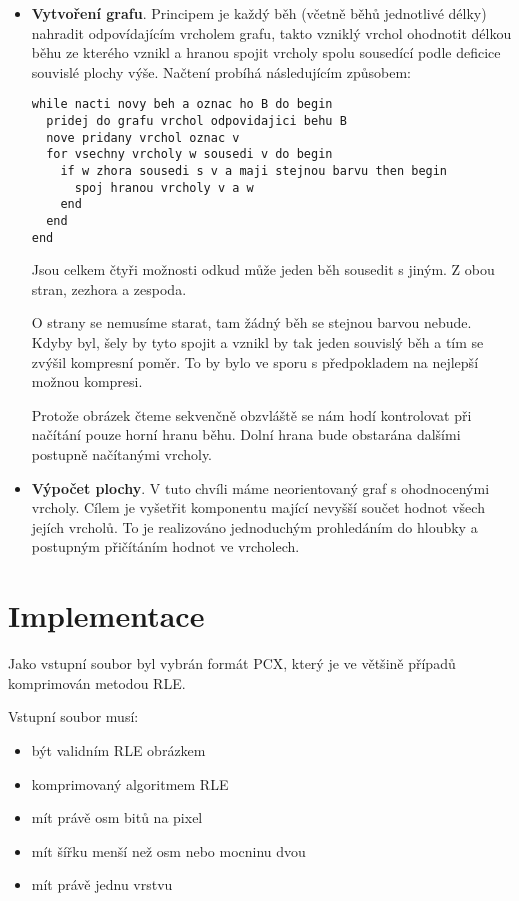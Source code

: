 \documentclass[12pt,a4paper]{article}
\begin{document}
\begin{itemize}
\item \textbf{Vytvoření grafu}. Principem je každý běh (včetně běhů jednotlivé délky) nahradit odpovídajícím vrcholem grafu, takto vzniklý vrchol ohodnotit délkou běhu ze kterého vznikl a hranou spojit vrcholy spolu sousedící podle deficice souvislé plochy výše. Načtení probíhá následujícím způsobem:

\begin{lstlisting}
while nacti novy beh a oznac ho B do begin
  pridej do grafu vrchol odpovidajici behu B
  nove pridany vrchol oznac v
  for vsechny vrcholy w sousedi v do begin
    if w zhora sousedi s v a maji stejnou barvu then begin
      spoj hranou vrcholy v a w
    end
  end
end
\end{lstlisting}

Jsou celkem čtyři možnosti odkud může jeden běh sousedit s jiným. Z obou stran, zezhora a zespoda. 

O strany se nemusíme starat, tam žádný běh se stejnou barvou nebude. Kdyby byl, šely by tyto spojit a vznikl by tak jeden souvislý běh a tím se zvýšil kompresní poměr. To by bylo ve sporu s předpokladem na nejlepší možnou kompresi.

Protože obrázek čteme sekvenčně obzvláště se nám hodí kontrolovat při načítání pouze horní hranu běhu. Dolní hrana bude obstarána dalšími postupně načítanými vrcholy.

\item \textbf{Výpočet plochy}. V tuto chvíli máme neorientovaný graf s ohodnocenými vrcholy. Cílem je vyšetřit komponentu mající nevyšší součet hodnot všech jejích vrcholů. To je realizováno jednoduchým prohledáním do hloubky a postupným přičítáním hodnot ve vrcholech.

\end{itemize}

\section{Implementace}

Jako vstupní soubor byl vybrán formát PCX, který je ve většině případů komprimován metodou RLE.

Vstupní soubor musí:
\begin{itemize}
\item být validním RLE obrázkem
\item komprimovaný algoritmem RLE
\item mít právě osm bitů na pixel
\item mít šířku menší než osm nebo mocninu dvou
\item mít právě jednu vrstvu
\end{itemize}
\end{document}
